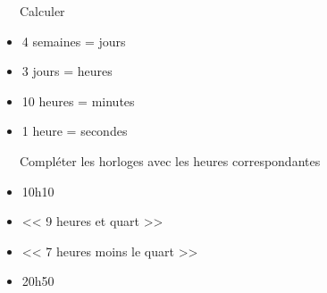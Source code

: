 \documentclass[12pt]{memoir}
\begin{document}
\begin{questions}
\setlength\itemsep{2em}

\exercice ~~~Calculer\\
\begin{itemize}
\setlength\itemsep{1em}
    \item 4 semaines = \dotss jours
    \item 3 jours = \dotss heures
    \item 10 heures = \dotss minutes
    \item 1 heure = \dotss secondes
\end{itemize}

\exercice ~~~Compléter les horloges avec les heures correspondantes\\
\begin{itemize}
\setlength\itemsep{1em}
    \item 10h10
    \item << 9 heures et quart >>
    \item << 7 heures moins le quart >>
    \item 20h50
\end{itemize}

\end{questions}
\end{document}
